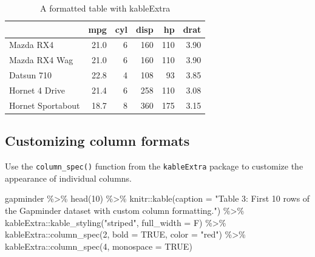 \documentclass[
]{book}
\newenvironment{Shaded}{\begin{snugshade}}{\end{snugshade}}
\newcommand{\AttributeTok}[1]{\textcolor[rgb]{0.77,0.63,0.00}{#1}}
\newcommand{\ConstantTok}[1]{\textcolor[rgb]{0.00,0.00,0.00}{#1}}
\newcommand{\DecValTok}[1]{\textcolor[rgb]{0.00,0.00,0.81}{#1}}
\newcommand{\FunctionTok}[1]{\textcolor[rgb]{0.00,0.00,0.00}{#1}}
\newcommand{\NormalTok}[1]{#1}
\newcommand{\SpecialCharTok}[1]{\textcolor[rgb]{0.00,0.00,0.00}{#1}}
\newcommand{\StringTok}[1]{\textcolor[rgb]{0.31,0.60,0.02}{#1}}
\begin{document}
\begin{table}

\caption{\label{tab:unnamed-chunk-3}A formatted table with kableExtra}
\centering
\begin{tabular}[t]{l|r|r|r|r|r}
\hline
  & mpg & cyl & disp & hp & drat\\
\hline
Mazda RX4 & 21.0 & 6 & 160 & 110 & 3.90\\
\hline
Mazda RX4 Wag & 21.0 & 6 & 160 & 110 & 3.90\\
\hline
Datsun 710 & 22.8 & 4 & 108 & 93 & 3.85\\
\hline
Hornet 4 Drive & 21.4 & 6 & 258 & 110 & 3.08\\
\hline
Hornet Sportabout & 18.7 & 8 & 360 & 175 & 3.15\\
\hline
\end{tabular}
\end{table}

\hypertarget{customizing-column-formats}{%
\subsection{Customizing column formats}\label{customizing-column-formats}}

Use the \texttt{column\_spec()} function from the \texttt{kableExtra} package to customize the appearance of individual columns.

\begin{Shaded}
\begin{Highlighting}[]
\NormalTok{gapminder }\SpecialCharTok{\%\textgreater{}\%}
  \FunctionTok{head}\NormalTok{(}\DecValTok{10}\NormalTok{) }\SpecialCharTok{\%\textgreater{}\%}
\NormalTok{  knitr}\SpecialCharTok{::}\FunctionTok{kable}\NormalTok{(}\AttributeTok{caption =} \StringTok{"Table 3: First 10 rows of the Gapminder dataset with custom column formatting."}\NormalTok{) }\SpecialCharTok{\%\textgreater{}\%}
\NormalTok{  kableExtra}\SpecialCharTok{::}\FunctionTok{kable\_styling}\NormalTok{(}\StringTok{"striped"}\NormalTok{, }\AttributeTok{full\_width =}\NormalTok{ F) }\SpecialCharTok{\%\textgreater{}\%}
\NormalTok{  kableExtra}\SpecialCharTok{::}\FunctionTok{column\_spec}\NormalTok{(}\DecValTok{2}\NormalTok{, }\AttributeTok{bold =} \ConstantTok{TRUE}\NormalTok{, }\AttributeTok{color =} \StringTok{"red"}\NormalTok{) }\SpecialCharTok{\%\textgreater{}\%}
\NormalTok{  kableExtra}\SpecialCharTok{::}\FunctionTok{column\_spec}\NormalTok{(}\DecValTok{4}\NormalTok{, }\AttributeTok{monospace =} \ConstantTok{TRUE}\NormalTok{)}
\end{Highlighting}
\end{Shaded}
\end{document}
